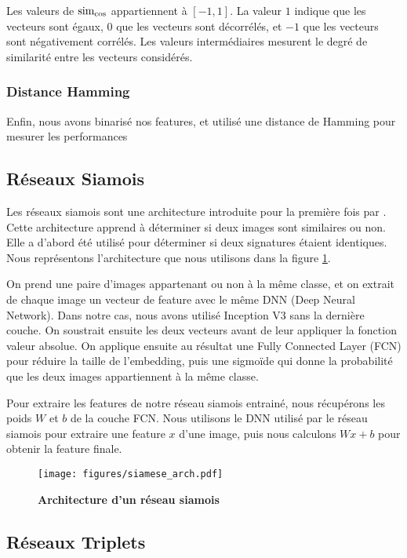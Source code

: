 Les valeurs de $\operatorname*{sim_{cos}}$ appartiennent à $\left[-1, 1\right]$. La valeur $1$ indique que les vecteurs sont égaux, $0$
que les vecteurs sont décorrélés, et $-1$ que les vecteurs sont négativement corrélés. Les valeurs intermédiaires
mesurent le degré de similarité entre les vecteurs considérés.

\subsubsection{Distance Hamming}

Enfin, nous avons binarisé nos features, et utilisé une distance de Hamming pour mesurer les performances

\subsection{R\'eseaux Siamois}

Les réseaux siamois sont une architecture introduite pour la première fois par \cite{signature1993bromley}. Cette
architecture apprend à déterminer si deux images sont similaires ou non. Elle a d'abord été utilisé pour déterminer si
deux signatures étaient identiques. Nous représentons l'architecture que nous utilisons dans la figure
\ref{fig:siamese_arch}.

On prend une paire d'images appartenant ou non à la même classe, et on extrait de chaque image un vecteur de feature
avec le même DNN (Deep Neural Network). Dans notre cas, nous avons utilisé Inception V3 sans la dernière couche. On
soustrait ensuite les deux vecteurs avant de leur appliquer la fonction valeur absolue. On applique ensuite au résultat
une Fully Connected Layer (FCN) pour réduire la taille de l'embedding, puis une sigmoïde qui donne la probabilité que
les deux images appartiennent à la même classe.

Pour extraire les features de notre réseau siamois entrainé, nous récupérons les poids $W$ et $b$ de la couche FCN. Nous
utilisons le DNN utilisé par le réseau siamois pour extraire une feature $x$ d'une image, puis nous calculons $Wx + b$
pour obtenir la feature finale.

\begin{figure}[ht]
    \center
    \texttt{[image: figures/siamese\_arch.pdf]}
    \caption{\label{fig:siamese_arch} \textbf{Architecture d'un r\'eseau siamois}}
\end{figure}

\subsection{R\'eseaux Triplets}

